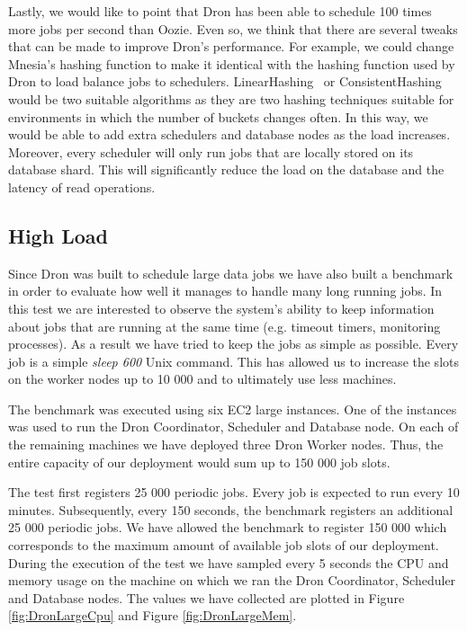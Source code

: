 \documentclass[11pt,a4paper,twoside]{report}
\begin{document}
Lastly, we would like to point that Dron has been able to schedule 100 times more jobs per second than Oozie. Even so, we think that there are several tweaks that can be made to improve Dron's performance. For example, we could change Mnesia's hashing function to make it identical with the hashing function used by Dron to load balance jobs to schedulers. LinearHashing~\cite{LinearHashing} or ConsistentHashing~\cite{ConsistentHashing} would be two suitable algorithms as they are two hashing techniques suitable for environments in which the number of buckets changes often. In this way, we would be able to add extra schedulers and database nodes as the load increases. Moreover, every scheduler will only run jobs that are locally stored on its database shard. This will significantly reduce the load on the database and the latency of read operations.

\subsection{High Load}
Since Dron was built to schedule large data jobs we have also built a benchmark in order to evaluate how well it manages to handle many long running jobs. In this test we are interested to observe the system's ability to keep information about jobs that are running at the same time (e.g. timeout timers, monitoring processes). As a result we have tried to keep the jobs as simple as possible. Every job is a simple \textit{sleep 600} Unix command. This has allowed us to increase the slots on the worker nodes up to 10 000 and to ultimately use less machines.


The benchmark was executed using six EC2 large instances. One of the instances was used to run the Dron Coordinator, Scheduler and Database node. On each of the remaining machines we have deployed three Dron Worker nodes. Thus, the entire capacity of our deployment would sum up to 150 000 job slots.


The test first registers 25 000 periodic jobs. Every job is expected to run every 10 minutes. Subsequently, every 150 seconds, the benchmark registers an additional 25 000 periodic jobs. We have allowed the benchmark to register 150 000 which corresponds to the maximum amount of available job slots of our deployment. During the execution of the test we have sampled every 5 seconds the CPU and memory usage on the machine on which we ran the Dron Coordinator, Scheduler and Database nodes. The values we have collected are plotted in Figure \ref{fig:DronLargeCpu} and Figure \ref{fig:DronLargeMem}.
\end{document}
